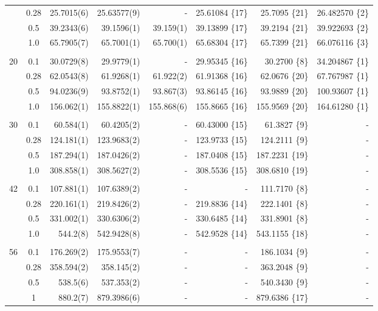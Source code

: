 \begin{table}
\begin{center}
\begin{tabular}{cc|rrrrrr}
          &   0.28   & 25.7015(6)  & 25.63577(9)  & - 		&25.61084 \{17\} 	& 25.7095 \{21\} & 26.482570 \{2\}\\
          &   0.5    & 39.2343(6)  & 39.1596(1)   & 39.159(1) &39.13899 \{17\}	& 39.2194 \{21\} & 39.922693 \{2\}\\
          &   1.0    & 65.7905(7)  & 65.7001(1)   & 65.700(1) &65.68304 \{17\}	& 65.7399 \{21\} & 66.076116 \{3\}\\
\cline{2-8}
\multicolumn{8}{c}{} \\
    20    &   0.1    &  30.0729(8)  &  29.9779(1) & -		&29.95345 \{16\}	& 30.2700 \{8\} & 34.204867 \{1\}\\
          &   0.28   &  62.0543(8)  &  61.9268(1) & 61.922(2) &61.91368 \{16\}	& 62.0676 \{20\} & 67.767987 \{1\}\\
          &   0.5    &  94.0236(9)  &  93.8752(1) & 93.867(3) &93.86145 \{16\}	& 93.9889 \{20\} & 100.93607 \{1\}\\
          &   1.0    & 156.062(1)   & 155.8822(1) & 155.868(6)&155.8665 \{16\}	& 155.9569 \{20\}& 164.61280 \{1\}\\
\cline{2-8}
\multicolumn{8}{c}{} \\
    30    &   0.1    &  60.584(1)  &  60.4205(2)  & -		&60.43000 \{15\}	&  61.3827 \{9\}& -\\
          &   0.28   & 124.181(1)  & 123.9683(2)  & - 		&123.9733 \{15\}	& 124.2111 \{9\}& -\\
          &   0.5    & 187.294(1)  & 187.0426(2)  & - 		&187.0408 \{15\}	& 187.2231 \{19\}& -\\
          &   1.0    & 308.858(1)  & 308.5627(2)  & -	 	&308.5536 \{15\}	& 308.6810 \{19\}& -\\
\cline{2-8}
\multicolumn{8}{c}{} \\
    42    &   0.1    & 107.881(1)  & 107.6389(2)  & - 		&- 			& 111.7170 \{8\}& -\\
          &   0.28   & 220.161(1)  & 219.8426(2)  & - 		&219.8836 \{14\}	& 222.1401 \{8\}& -\\
          &   0.5    & 331.002(1)  & 330.6306(2)  & - 		&330.6485 \{14\}	& 331.8901 \{8\}& -\\
          &   1.0    & 544.2(8)    & 542.9428(8)  & - 		&542.9528 \{14\}	& 543.1155 \{18\}& -\\
\cline{2-8}
\multicolumn{8}{c}{} \\
    56    &   0.1    & 176.269(2) & 175.9553(7)   & -		& -		& 186.1034 \{9\} & -		\\
          &   0.28   & 358.594(2) & 358.145(2)    & -		& -		& 363.2048 \{9\} & -		\\
          &   0.5    & 538.5(6)   & 537.353(2)    & -		& -		& 540.3430 \{9\} & -		\\
          &   1      & 880.2(7)   & 879.3986(6)   & -		& -		& 879.6386 \{17\}& -		\\
\hline\hline



\end{tabular}
\end{center}
\end{table}
